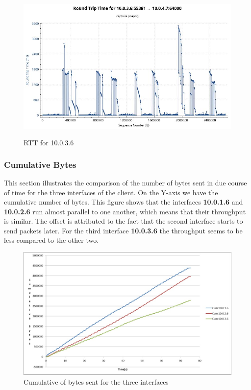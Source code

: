 \documentclass[a4paper,11pt]{article}
\begin{document}
			\begin{figure}[h!]
				\begin{center}
					\label{fig:rtt3}
					\includegraphics[scale=0.45]{pictures/rtt3.jpeg}
					\caption[]{RTT for 10.0.3.6}
				\end{center}
			\end{figure}

			\clearpage
			\subsubsection{Cumulative Bytes}
			\label{subsubsec:cumbytes}
			This section illustrates the comparison of the number of bytes sent in due course of time for the three interfaces of the client. On the Y-axis we have the cumulative number of bytes. This figure shows that the interfaces \textbf{10.0.1.6} and \textbf{10.0.2.6} run almost parallel to one another, which means that their throughput is similar. The offset is attributed to the fact that the second interface starts to send packets later. For the third interface \textbf{10.0.3.6} the throughput seems to be less compared to the other two.
			\begin{figure}[h!]
				\centering
					\label{fig:cumbytes}
					\includegraphics[scale=0.5]{pictures/cumbytes.jpg}
					\caption[]{Cumulative of bytes sent for the three interfaces}
			\end{figure}
\end{document}
